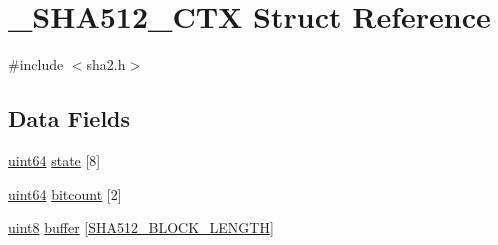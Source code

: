 \hypertarget{struct__SHA512__CTX}{\section{\-\_\-\-S\-H\-A512\-\_\-\-C\-T\-X Struct Reference}
\label{struct__SHA512__CTX}
}


{\ttfamily \#include $<$sha2.\-h$>$}

\subsection*{Data Fields}
\begin{DoxyCompactItemize}
\item 
\hyperlink{c_8h_af68cb4c1926b997d49286c1e0c7fa68a}{uint64} \hyperlink{struct__SHA512__CTX_aa31ef0b0038ff139062dd31a17110043}{state} \mbox{[}8\mbox{]}
\item 
\hyperlink{c_8h_af68cb4c1926b997d49286c1e0c7fa68a}{uint64} \hyperlink{struct__SHA512__CTX_a65507242047a042c46547894790a07ed}{bitcount} \mbox{[}2\mbox{]}
\item 
\hyperlink{c_8h_adde6aaee8457bee49c2a92621fe22b79}{uint8} \hyperlink{struct__SHA512__CTX_af5939aad9b5e75338c05523479208e5f}{buffer} \mbox{[}\hyperlink{sha2_8h_a768752124501032a219d4426b2ce3197}{S\-H\-A512\-\_\-\-B\-L\-O\-C\-K\-\_\-\-L\-E\-N\-G\-T\-H}\mbox{]}
\end{DoxyCompactItemize}



